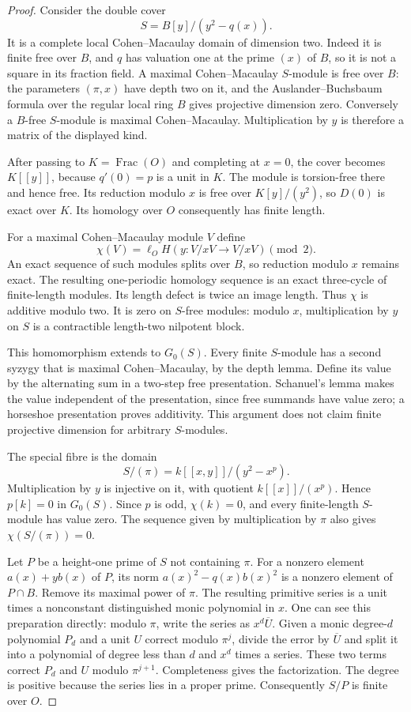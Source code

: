 \begin{proof}
Consider the double cover
\[
 S=B[y]/(y^2-q(x)).
\]
It is a complete local Cohen--Macaulay domain of dimension two.
Indeed it is finite free over $B$, and $q$ has valuation one at
the prime $(x)$ of $B$, so it is not a square in its fraction field.
A maximal Cohen--Macaulay $S$-module is free over $B$: the parameters
$(\pi,x)$ have depth two on it, and the Auslander--Buchsbaum formula
over the regular local ring $B$ gives projective dimension zero.
Conversely a $B$-free $S$-module is maximal Cohen--Macaulay.
Multiplication by $y$ is therefore a matrix of the displayed kind.

After passing to $K=\operatorname{Frac}(O)$ and completing at $x=0$,
the cover becomes $K[[y]]$, because $q'(0)=p$ is a unit in $K$.
The module is torsion-free there and hence free.  Its reduction
modulo $x$ is free over $K[y]/(y^2)$, so $D(0)$ is exact over $K$.
Its homology over $O$ consequently has finite length.

For a maximal Cohen--Macaulay module $V$ define
\[
 \chi(V)=\ell_O H(y:V/xV\longrightarrow V/xV)\pmod2.
\]
An exact sequence of such modules splits over $B$, so reduction
modulo $x$ remains exact.  The resulting one-periodic homology
sequence is an exact three-cycle of finite-length modules.  Its
length defect is twice an image length.  Thus $\chi$ is additive
modulo two.  It is zero on $S$-free modules: modulo $x$, multiplication
by $y$ on $S$ is a contractible length-two nilpotent block.

This homomorphism extends to $G_0(S)$.  Every finite $S$-module has
a second syzygy that is maximal Cohen--Macaulay, by the depth lemma.
Define its value by the alternating sum in a two-step free
presentation.  Schanuel's lemma makes the value independent of the
presentation, since free summands have value zero; a horseshoe
presentation proves additivity.  This argument does not claim finite
projective dimension for arbitrary $S$-modules.

The special fibre is the domain
\[
 S/(\pi)=k[[x,y]]/(y^2-x^p).
\]
Multiplication by $y$ is injective on it, with quotient
$k[[x]]/(x^p)$.  Hence $p[k]=0$ in $G_0(S)$.  Since $p$ is odd,
$\chi(k)=0$, and every finite-length $S$-module has value zero.
The sequence given by multiplication by $\pi$ also gives
$\chi(S/(\pi))=0$.

Let $P$ be a height-one prime of $S$ not containing $\pi$.
For a nonzero element $a(x)+yb(x)$ of $P$, its norm
$a(x)^2-q(x)b(x)^2$ is a nonzero element of $P\cap B$.
Remove its maximal power of $\pi$.  The resulting primitive series
is a unit times a nonconstant distinguished monic polynomial in
$x$.  One can see this preparation directly: modulo $\pi$, write
the series as $x^d\overline U$.  Given a monic degree-$d$ polynomial
$P_d$ and a unit $U$ correct modulo $\pi^j$, divide the error by
$\overline U$ and split it into a polynomial of degree less than
$d$ and $x^d$ times a series.  These two terms correct $P_d$ and
$U$ modulo $\pi^{j+1}$.  Completeness gives the factorization.
The degree is positive because the series lies in a proper prime.
Consequently $S/P$ is finite over $O$.


\end{proof}
